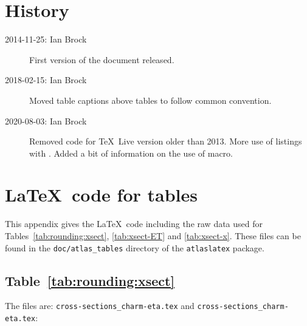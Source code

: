 \documentclass[UKenglish, texlive=2020]{atlasdoc}
\begin{document}
\clearpage
\section*{History}

\begin{description}
\item[2014-11-25: Ian Brock] First version of the document released.
\item[2018-02-15: Ian Brock] Moved table captions above tables to follow common convention.
\item[2020-08-03: Ian Brock] Removed code for \TeX\ Live version older than 2013.
  More use of listings with .
  Added a bit of information on the use of  macro.
\end{description}


\printbibliography
% 
% 

\clearpage
\appendix
\section{\LaTeX\ code for tables}
\label{sec:raw-data}

This appendix gives the \LaTeX\ code including the raw data used for
Tables~\ref{tab:rounding:xsect},
\ref{tab:xsect-ET} and \ref{tab:xsect-x}.
These files can be found in the \texttt{doc/atlas\_tables} directory
of the \texttt{atlaslatex} package.

\subsection{Table~\protect\ref{tab:rounding:xsect}}

The files are: \texttt{cross-sections\_charm-eta.tex} and
\texttt{cross-sections\_charm-eta.tex}:

\end{document}
